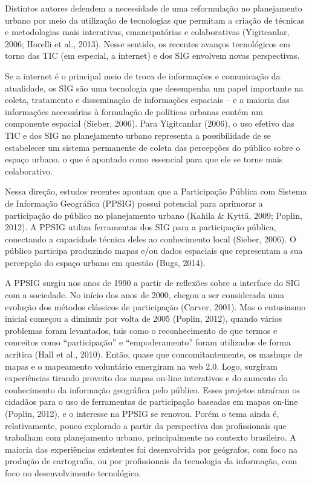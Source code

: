 \documentclass{article}
\begin{document}
Distintos autores defendem a necessidade de uma reformulação no planejamento
urbano
por meio da utilização de tecnologias que permitam a criação de técnicas e
metodologias mais interativas, emancipatórias e colaborativas (Yigitcanlar,
2006; Horelli et
al., 2013). Nesse sentido, os recentes avanços tecnológicos em torno das
TIC (em especial, a internet) e dos SIG envolvem novas perspectivas.

Se a internet é o principal meio de troca de informações e comunicação da
atualidade,
os SIG são uma tecnologia que desempenha um papel importante na coleta,
tratamento e
disseminação de informações espaciais – e a maioria das informações necessárias
à
formulação de políticas urbanas contém um componente espacial (Sieber, 2006).
Para Yigitcanlar (2006), o uso efetivo das TIC e dos SIG no planejamento
urbano representa a possibilidade de se estabelecer um sistema permanente de
coleta
das percepções do público sobre o espaço urbano, o que é apontado como essencial
para que ele se torne mais colaborativo.

Nessa direção, estudos recentes apontam que a Participação Pública com Sistema
de
Informação Geográfica (PPSIG) possui potencial para aprimorar a participação do
público no planejamento urbano (Kahila \& Kyttä,
2009; Poplin, 2012). A PPSIG
utiliza ferramentas dos SIG para a participação pública, conectando a capacidade
técnica deles ao conhecimento local (Sieber,
2006). O público participa produzindo mapas e/ou dados espaciais que
representam a sua percepção do espaço urbano em questão (Bugs, 2014).

A PPSIG surgiu nos anos de 1990 a partir de reflexões sobre a interface do SIG
com a
sociedade. No início dos anos de 2000, chegou a ser considerada uma evolução dos
métodos clássicos de participação (Carver,
2001). Mas o entusiasmo inicial começou a diminuir por volta de 2005
(Poplin, 2012), quando vários problemas
foram levantados, tais como o reconhecimento de que termos e conceitos como
“participação” e “empoderamento” foram utilizados de forma acrítica (Hall et
al., 2010). Então, quase que
concomitantemente, os mashups de mapas e o mapeamento voluntário
emergiram na web 2.0. Logo, surgiram experiências tirando proveito dos mapas
on-line
interativos e do aumento do conhecimento da informação geográfica pelo público.
Esses projetos atraíram os cidadãos para o uso de ferramentas de participação
baseadas em mapas on-line (Poplin, 2012), e
o interesse na PPSIG se renovou. Porém o tema ainda é, relativamente, pouco
explorado a partir da perspectiva dos profissionais que trabalham com
planejamento
urbano, principalmente no contexto brasileiro. A maioria das experiências
existentes
foi desenvolvida por geógrafos, com foco na produção de cartografia, ou por
profissionais da tecnologia da informação, com foco no desenvolvimento
tecnológico.
\end{document}
